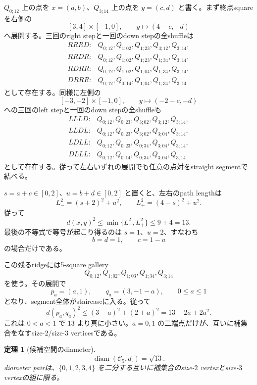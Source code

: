 \documentclass[11pt,a4paper]{ltjsarticle}
\newtheorem{theorem}{定理}[section]
\theoremstyle{definition}
\theoremstyle{remark}
\newcommand{\cC}{\mathcal C}
\newcommand{\diam}{\operatorname{diam}}
\begin{document}
$Q_{0;12}$ 上の点を $x=(a,b)$、$Q_{3;14}$ 上の点を $y=(c,d)$ と書く。まず終点squareを右側の
\[
 [3,4]\times[-1,0],
 \qquad y\longmapsto(4-c,-d)
\]
へ展開する。三回のright stepと一回のdown stepの全shuffleは
\[
 \begin{array}{ll}
 RRRD:&Q_{0;12},Q_{1;02},Q_{1;23},Q_{3;12},Q_{3;14},\\
 RRDR:&Q_{0;12},Q_{1;02},Q_{1;23},Q_{1;34},Q_{3;14},\\
 RDRR:&Q_{0;12},Q_{1;02},Q_{1;04},Q_{1;34},Q_{3;14},\\
 DRRR:&Q_{0;12},Q_{0;14},Q_{1;04},Q_{1;34},Q_{3;14}
 \end{array}
\]
として存在する。同様に左側の
\[
 [-3,-2]\times[-1,0],
 \qquad y\longmapsto(-2-c,-d)
\]
への三回のleft stepと一回のdown stepの全shuffleも
\[
 \begin{array}{ll}
 LLLD:&Q_{0;12},Q_{0;23},Q_{3;02},Q_{3;12},Q_{3;14},\\
 LLDL:&Q_{0;12},Q_{0;23},Q_{3;02},Q_{3;04},Q_{3;14},\\
 LDLL:&Q_{0;12},Q_{0;23},Q_{0;34},Q_{3;04},Q_{3;14},\\
 DLLL:&Q_{0;12},Q_{0;14},Q_{0;34},Q_{3;04},Q_{3;14}
 \end{array}
\]
として存在する。従って左右いずれの展開でも任意の点対をstraight segmentで結べる。

$s=a+c\in[0,2]$、$u=b+d\in[0,2]$ と置くと、左右のpath lengthは
\begin{equation}\label{eq:orbit9-two-bounds}
 L_-^2=(s+2)^2+u^2,
 \qquad
 L_+^2=(4-s)^2+u^2.
\end{equation}
従って
\begin{equation}\label{eq:orbit9-global}
 d(x,y)^2
 \leq\min\{L_-^2,L_+^2\}
 \leq9+4=13.
\end{equation}
最後の不等式で等号が起こり得るのは $s=1$、$u=2$、すなわち
\[
 b=d=1,\qquad c=1-a
\]
の場合だけである。

この残るridgeには5-square gallery
\[
 Q_{0;12},Q_{1;02},Q_{1;03},Q_{1;34},Q_{3;14}
\]
を使う。その展開で
\[
 p_a=(a,1),
 \qquad q_a=(3,-1-a),
 \qquad 0\leq a\leq1
\]
となり、segment全体がstaircaseに入る。従って
\begin{equation}\label{eq:orbit9-ridge-sharp}
 d(p_a,q_a)^2
 \leq(3-a)^2+(2+a)^2
 =13-2a+2a^2.
\end{equation}
これは $0<a<1$ で $13$ より真に小さい。$a=0,1$ の二端点だけが、互いに補集合をなすsize-$2$/size-$3$ verticesである。

\begin{theorem}[候補空間のdiameter]\label{thm:modeldiameter}
\[
 \boxed{\diam(\cC_5,d_\square)=\sqrt{13}.}
\]
diameter pairは、$\{0,1,2,3,4\}$ を二分する互いに補集合のsize-$2$ vertexとsize-$3$ vertexの組に限る。
\end{theorem}
\end{document}
